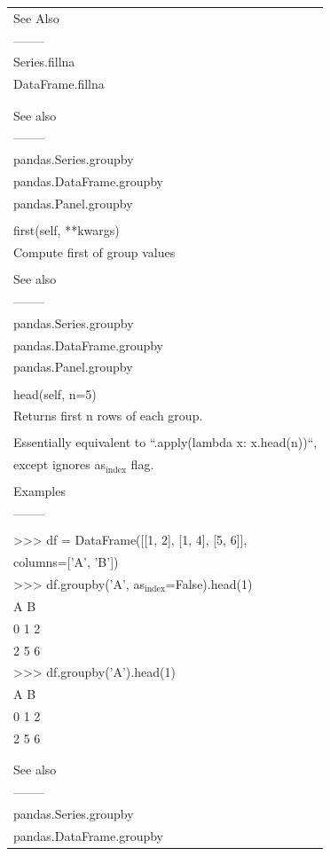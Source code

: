 \documentclass[11pt]{article}
\begin{document}
\begin{enumerate}
\begin{enumerate}
\begin{enumerate}
\begin{center}
\begin{tabular}{l}
See Also\\
--------\\
Series.fillna\\
DataFrame.fillna\\
\\
\\
See also\\
--------\\
pandas.Series.groupby\\
pandas.DataFrame.groupby\\
pandas.Panel.groupby\\
\\
first(self, **kwargs)\\
Compute first of group values\\
\\
See also\\
--------\\
pandas.Series.groupby\\
pandas.DataFrame.groupby\\
pandas.Panel.groupby\\
\\
head(self, n=5)\\
Returns first n rows of each group.\\
\\
Essentially equivalent to ``.apply(lambda x: x.head(n))``,\\
except ignores as\(_{\text{index}}\) flag.\\
\\
Examples\\
--------\\
\\
>>> df = DataFrame([[1, 2], [1, 4], [5, 6]],\\
columns=['A', 'B'])\\
>>> df.groupby('A', as\(_{\text{index}}\)=False).head(1)\\
A  B\\
0  1  2\\
2  5  6\\
>>> df.groupby('A').head(1)\\
A  B\\
0  1  2\\
2  5  6\\
\\
\\
See also\\
--------\\
pandas.Series.groupby\\
pandas.DataFrame.groupby\\

\end{tabular}
\end{center}
\end{enumerate}
\end{enumerate}
\end{enumerate}
\end{document}
